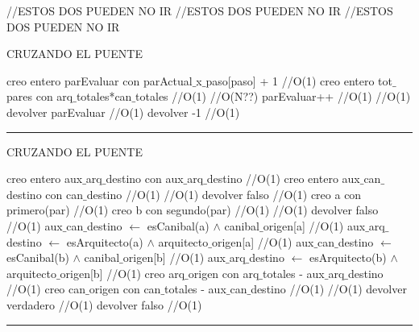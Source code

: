 //ESTOS DOS PUEDEN NO IR
//ESTOS DOS PUEDEN NO IR
//ESTOS DOS PUEDEN NO IR

\begin{algorithm}[H]
\caption{CRUZANDO EL PUENTE}
\begin{algorithmic}[1]
\state creo entero parEvaluar con parActual$\_$x$\_$paso[paso] + 1 \hfill //O(1)
\state creo entero tot$\_$pares con arq$\_$totales*can$\_$totales \hfill //O(1)
 \hfill //O(N??)
\state parEvaluar++ \hfill //O(1)
\endwhile
{} \hfill //O(1)
\state devolver  parEvaluar \hfill //O(1)
\Else
\state devolver -1 \hfill //O(1)
\endif
\EndFunction 
\end{algorithmic}
\hrule
{}
\end{algorithm}


\begin{algorithm}[H]
\caption{CRUZANDO EL PUENTE}
\begin{algorithmic}[1]
\state creo entero aux$\_$arq$\_$destino con aux$\_$arq$\_$destino \hfill //O(1)
\state creo entero aux$\_$can$\_$destino con can$\_$destino \hfill //O(1)
 \hfill //O(1)
\state devolver  falso \hfill //O(1)
\endif
\state creo a con primero(par) \hfill //O(1)
\state creo b con segundo(par) \hfill //O(1)
 \hfill //O(1)
\state devolver  falso \hfill //O(1)
\endif
\state aux$\_$can$\_$destino $\gets$  esCanibal(a) $\wedge$ canibal$\_$origen[a] \hfill //O(1)
\state aux$\_$arq$\_$destino $\gets$  esArquitecto(a) $\wedge$ arquitecto$\_$origen[a] \hfill //O(1)
\state aux$\_$can$\_$destino $\gets$  esCanibal(b) $\wedge$ canibal$\_$origen[b] \hfill //O(1)
\state aux$\_$arq$\_$destino $\gets$  esArquitecto(b) $\wedge$ arquitecto$\_$origen[b] \hfill //O(1)
\state creo arq$\_$origen con arq$\_$totales - aux$\_$arq$\_$destino \hfill //O(1)
\state creo can$\_$origen con can$\_$totales - aux$\_$can$\_$destino \hfill //O(1)
 \hfill //O(1)
\state devolver  verdadero \hfill //O(1)
\Else
\state devolver  falso \hfill //O(1)
\endif

\EndFunction 
\end{algorithmic}
\hrule
{}
\end{algorithm}